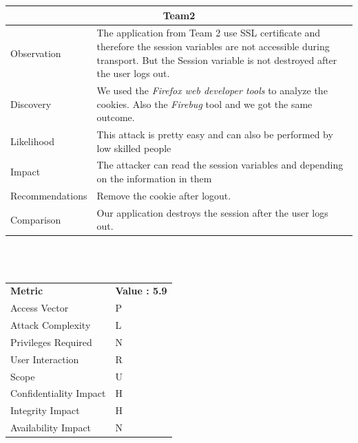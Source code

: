 \documentclass[headsepline,footsepline,footinclude=false,oneside,fontsize=11pt,paper=a4,listof=totoc,bibliography=totoc]{scrbook} %
\begin{document}
\begin{tabular}{ l|p{11cm}  }
	\hline
	\multicolumn{2}{c}{\textbf{Team2}} \\
	\hline
	Observation & The application from Team 2  use SSL certificate and therefore the session variables
	are not accessible during transport. But the Session variable is not destroyed after the user logs out.\\
	Discovery & We used the \textit{Firefox web developer tools} to analyze the cookies. Also the \textit{Firebug} tool and we got the same outcome. \\
	Likelihood & This attack is pretty easy and can also be performed by low skilled people\\
	Impact & The attacker can read the session variables and depending on the information in them  \\
	Recommendations & Remove the cookie after logout.\\
	Comparison & Our application destroys the session after the user logs out.\\
	\hline
\end{tabular}
\\
\vspace{0.5cm}
\\
\begin{center}
	\begin{tabular}{ll}
		\rowcolor[HTML]{34CDF9}
		{\color[HTML]{ECF4FF} \textbf{Metric}}        & {\color[HTML]{ECF4FF} \textbf{Value : 5.9}} \\
		\rowcolor[HTML]{BBDAFF}
		{\color[HTML]{333333} Access Vector}          & {\color[HTML]{333333} } P             \\
		\rowcolor[HTML]{ECF4FF}
		{\color[HTML]{333333} Attack Complexity}      & {\color[HTML]{333333} } L              \\
		\rowcolor[HTML]{BBDAFF}
		{\color[HTML]{333333} Privileges Required}    & {\color[HTML]{333333} } N              \\
		\rowcolor[HTML]{ECF4FF}
		{\color[HTML]{333333} User Interaction}       & {\color[HTML]{333333} } R              \\
		\rowcolor[HTML]{BBDAFF}
		{\color[HTML]{333333} Scope}                  & {\color[HTML]{333333} } U              \\
		\rowcolor[HTML]{ECF4FF}
		{\color[HTML]{333333} Confidentiality Impact} & {\color[HTML]{333333} } H              \\
		\rowcolor[HTML]{BBDAFF}
		{\color[HTML]{333333} Integrity Impact}       & {\color[HTML]{333333} } H              \\
		\rowcolor[HTML]{ECF4FF}
		{\color[HTML]{333333} Availability Impact}    & {\color[HTML]{333333} } N
	\end{tabular}
\end{center}
\pagebreak
\end{document}
